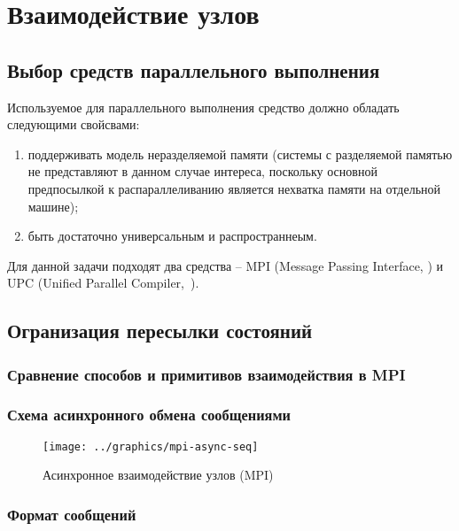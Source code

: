 \chapter{Взаимодействие узлов}
\label{cha:communication}

\section{Выбор средств параллельного выполнения}
\label{sec:parall-selection}

Используемое для параллельного выполнения средство должно обладать следующими свойсвами:
\begin{enumerate}
\item поддерживать модель неразделяемой памяти (системы с разделяемой памятью не
  представляют в данном случае интереса, поскольку основной предпосылкой к
  распараллеливанию является нехватка памяти на отдельной машине);
\item быть достаточно универсальным и распространнеым.
\end{enumerate}

Для данной задачи подходят два средства -- MPI (Message Passing Interface, \cite{MPI}) и UPC (Unified
Parallel Compiler,~\cite{UPC12}).

\section{Огранизация пересылки состояний}
\label{sec:mpi-interaction}

\subsection{Сравнение способов и примитивов взаимодействия в MPI}
\label{sec:mpi-primitives}

\subsection{Схема асинхронного обмена сообщениями}
\label{sec:async-mpi-queue}

\begin{figure}[ht]
  \centering
  \texttt{[image: ../graphics/mpi-async-seq]}  
  \caption{Асинхронное взаимодействие узлов (MPI)}
  \label{fig:mpi-async-seq}
\end{figure}

\subsection{Формат сообщений}
\label{sec:message-format}

